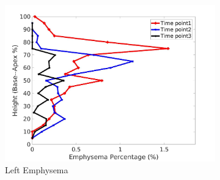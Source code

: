 \begin{figure}[H]
\begin{subfigure}{.42\linewidth}
  \includegraphics[width=\linewidth,trim={{.0\wd0} {.0\wd0} {.0\wd0} {.0\wd0}},clip]{Appendix/Image_AppexA/BaseToApex/IPF2LeftLungEmphysemaDiseaseAgainstHeight.jpg} %
  \caption{Left Emphysema}
  \label{fig:IPF2DiseaseAgainstHeight-g} 
\end{subfigure} 
\begin{subfigure}{.42\linewidth}%

\end{subfigure}
\end{figure}
